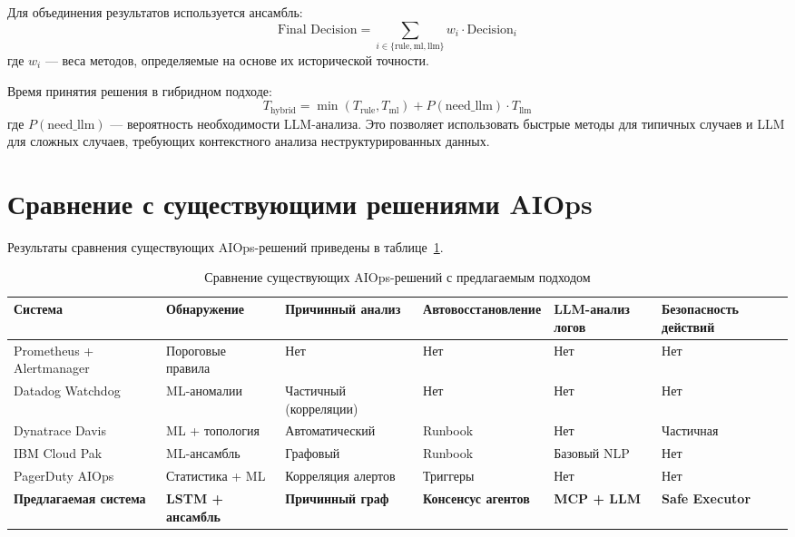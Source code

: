 Для объединения результатов используется ансамбль:
\begin{equation}
\text{Final Decision} = \sum_{i \in \{\text{rule}, \text{ml}, \text{llm}\}} w_i \cdot \text{Decision}_i
\label{eq:ensemble_decision}
\end{equation}
где $w_i$ --- веса методов, определяемые на основе их исторической точности.

Время принятия решения в гибридном подходе:
\begin{equation}
T_{\text{hybrid}} = \min(T_{\text{rule}}, T_{\text{ml}}) + P(\text{need\_llm}) \cdot T_{\text{llm}}
\label{eq:hybrid_time}
\end{equation}
где $P(\text{need\_llm})$ --- вероятность необходимости LLM-анализа. Это позволяет использовать быстрые методы для типичных случаев и LLM для сложных случаев, требующих контекстного анализа неструктурированных данных.

\section{Сравнение с существующими решениями AIOps}

Результаты сравнения существующих AIOps-решений приведены в таблице~\ref{tab:aiops_comparison}.

\begin{table}[H]
\centering
\small
\caption{Сравнение существующих AIOps-решений с предлагаемым подходом}
\label{tab:aiops_comparison}
\begin{tabularx}{\textwidth}{|p{2.5cm}|>{\raggedright\arraybackslash}X|>{\raggedright\arraybackslash}X|>{\raggedright\arraybackslash}X|>{\raggedright\arraybackslash}X|>{\raggedright\arraybackslash}X|}
\hline
\textbf{Система} & \textbf{Обнару\-жение} & \textbf{Причинный анализ} & \textbf{Авто\-восстанов\-ление} & \textbf{LLM-ана\-лиз логов} & \textbf{Безопас\-ность действий} \\
\hline
Prometheus + Alert\-manager & Пороговые правила & Нет & Нет & Нет & Нет \\
\hline
Datadog Watchdog \cite{aiops_survey} & ML-ано\-малии & Частичный (корреляции) & Нет & Нет & Нет \\
\hline
Dynatrace Davis \cite{gartner_aiops} & ML + топология & Автомати\-ческий & Runbook & Нет & Частичная \\
\hline
IBM Cloud Pak \cite{gartner_aiops} & ML-ансамбль & Графовый & Runbook & Базовый NLP & Нет \\
\hline
PagerDuty AIOps \cite{aiops_survey} & Статистика + ML & Корреляция алертов & Триггеры & Нет & Нет \\
\hline
\textbf{Предлага\-емая система} & \textbf{LSTM + ансамбль} & \textbf{Причинный граф} & \textbf{Консенсус агентов} & \textbf{MCP + LLM} & \textbf{Safe Executor} \\
\hline
\end{tabularx}
\end{table}

